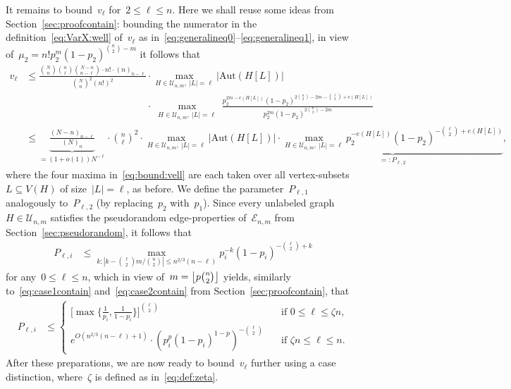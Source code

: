 \documentclass{article}
\newcommand{\cE}{\mathcal{E}}
\newcommand{\T}{\mathcal{U}_{n,m}}
\newcommand\lrpar[1]{\left(#1\right)}
\newcommand\abs[1]{\left|#1\right|}
\newcommand\floor[1]{\left\lfloor #1 \right \rfloor}
\newcommand{\Aut}{\mathrm{Aut}}
\renewcommand{\v}{v}
\newcommand\biggsqpar[1]{\biggl[#1\biggr]}
\newcommand\biggcpar[1]{\biggl\{#1\biggr\}}
\begin{document}
It remains to bound~$v_{\ell}$ for~$2 \le \ell \le n$.
Here we shall reuse some ideas from  Section~\ref{sec:proofcontain}: 
bounding the numerator in the definition~\eqref{eq:VarX:well} of~$v_{\ell}$ as in~\eqref{eq:generalineq0}--\eqref{eq:generalineq1},
in view of~$\mu_2={n!p_2^m(1-p_2)^{\binom{n}{2}-m}}$ it follows that  
\begin{equation}\label{eq:bound:vell}
\begin{split}
\v_\ell &\le \frac{\binom{N}{n}\binom{n}{\ell}\binom{N-n}{n-\ell} \cdot n! \cdot (n)_{n-\ell}}{\binom{N}{n}^2(n!)^2} \cdot \max_{H\in \T, \: |L|=\ell} |\Aut(H[L])| \\
& \phantom{\le \frac{\binom{N}{n}\binom{n}{\ell}\binom{N-n}{n-\ell} \cdot n! \cdot (n)_{n-\ell}}{\binom{N}{n}^2(n!)^2}} \cdot \max_{\substack{H\in \T, \: |L|=\ell}}\frac{p_2^{2m-e(H[L])} (1-p_2)^{2\binom{n}{2}-2m-\binom{\ell}{2}+e(H[L])}}{ p_2^{2m} (1-p_2)^{2\binom{n}{2}-2m}}\\
&\le \underbrace{\frac{(N-n)_{n-\ell}}{(N)_n}}_{=(1+o(1))N^{-\ell}} \cdot  \binom{n}{\ell}^2
\cdot 
\max_{H\in \T, \: |L|=\ell} |\Aut(H[L])|
\cdot \underbrace{\max_{H\in \T, \: |L|=\ell}{p_2^{-e(H[L])} (1-p_2)^{-\binom{\ell}{2}+e(H[L])}}}_{=:P_{\ell,2}},
\end{split}
\end{equation}
where the four maxima in~\eqref{eq:bound:vell} are each taken over all vertex-subsets $L \subseteq V(H)$ of size~$|L|=\ell$, as before. 
We define the parameter~$P_{\ell,1}$  analogously to~$P_{\ell,2}$ (by replacing~$p_2$ with~$p_1$).
Since every unlabeled graph ${H \in \T}$ satisfies the pseudorandom edge-properties of~$\cE_{n,m}$ from Section~\ref{sec:pseudorandom}, 
it follows that 
\begin{equation}\label{eq:gbound:0}
\begin{split}
P_{\ell,i}
& \le \max_{k: \abs{k-\binom{\ell}{2}m/\binom{n}{2}}\le n^{2/3}(n-\ell)} p_i^{-k} (1-p_i)^{-\binom{\ell}{2}+k}
\end{split}
\end{equation}
for any~$0 \le \ell \le n$, which in view of~$m=\floor{p\tbinom{n}{2}}$ yields, similarly to~\eqref{eq:case1contain} and~\eqref{eq:case2contain} from Section~\ref{sec:proofcontain}, that 
\begin{equation}\label{eq:gbound}
\begin{split}
P_{\ell,i}
& \le \begin{cases}
        \biggsqpar{\max\biggcpar{\frac{1}{p_i},\frac{1}{1-p_i}}}^{\binom{\ell}{2}} \quad & \text{if~$0 \le \ell\le \zeta n$,} \\
        e^{O\lrpar{n^{2/3}(n-\ell)+1}} \cdot \lrpar{{p_i^p (1-p_i)^{1-p}} }^{-\binom{\ell}{2}} \quad 
        & \text{if~$\zeta n\le \ell\le n$.}
    \end{cases}
\end{split}
\end{equation}
After these preparations, we are now ready to bound~$\v_\ell$ further using a case distinction, 
where~$\zeta$ is defined as in~\eqref{eq:def:zeta}. 
\end{document}
